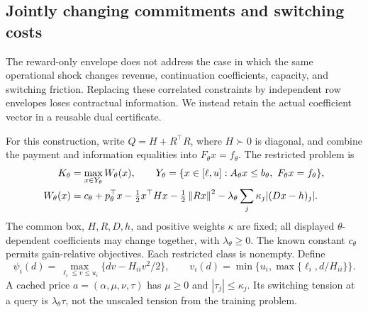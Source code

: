 \subsection{Jointly changing commitments and switching costs}\label{sec:r27-cache}
The reward-only envelope does not address the case in which the same operational shock changes revenue, continuation coefficients, capacity, and switching friction. Replacing these correlated constraints by independent row envelopes loses contractual information. We instead retain the actual coefficient vector in a reusable dual certificate.

For this construction, write $Q=H+R^\top R$, where $H\succ0$ is diagonal, and combine the payment and information equalities into $F_\theta x=f_\theta$. The restricted problem is
\begin{align}
 K_\theta&=\max_{x\in Y_\theta}W_\theta(x),\qquad
 Y_\theta=\{x\in[\ell,u]:A_\theta x\leq b_\theta,\ F_\theta x=f_\theta\},\label{eq:r27-model}\\
 W_\theta(x)&=c_\theta+p_\theta^\top x-\tfrac12x^\top Hx
 -\tfrac12\left\lVert Rx\right\rVert^2-\lambda_\theta\sum_j\kappa_j|(Dx-h)_j|.\notag
\end{align}
The common box, $H,R,D,h$, and positive weights $\kappa$ are fixed; all displayed $\theta$-dependent coefficients may change together, with $\lambda_\theta\geq0$. The known constant $c_\theta$ permits gain-relative objectives. Each restricted class is nonempty. Define
\[
 \psi_i(d)=\max_{\ell_i\leq v\leq u_i}\{dv-H_{ii}v^2/2\},
 \qquad v_i(d)=\min\{u_i,\max\{\ell_i,d/H_{ii}\}\}.
\]
A cached price $a=(\alpha,\mu,\nu,\tau)$ has $\mu\geq0$ and $|\tau_j|\leq\kappa_j$. Its switching tension at a query is $\lambda_\theta\tau$, not the unscaled tension from the training problem.

